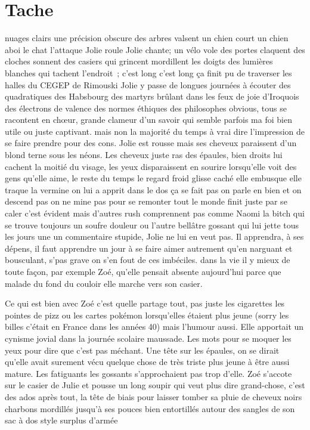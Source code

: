  \section*{Tache}
 nuages clairs une précision obscure des arbres valsent un chien court un
 chien aboi le chat l’attaque Jolie roule Jolie chante; un vélo vole des portes
 claquent des cloches sonnent des casiers qui grincent mordillent les doigts
 des lumières blanches qui tachent l’endroit ; c’est long c’est long ça finit
 pu de traverser les halles du  CEGEP de Rimouski Jolie y passe de
 longues journées à écouter des quadratiques des Habsbourg des martyrs brûlant
 dans les feux de joie d’Iroquois des électrons de valence des normes éthiques
 des philosophes obvious, tous se racontent en chœur, grande clameur d’un
 savoir qui semble parfois ma foi bien utile ou juste captivant. mais non la
 majorité du temps à vrai dire l’impression de se faire prendre pour des cons.
 Jolie est rousse mais ses cheveux paraissent d’un blond terne sous les néons.
 Les cheveux juste ras des épaules, bien droits lui cachent la moitié du
 visage, les yeux disparaissent en sourire lorsqu’elle voit des gens qu’elle
 aime, le reste du temps le regard froid glisse caché elle embusque elle traque
 la vermine on lui a apprit dans le dos ça se fait pas on parle en bien et on
 descend pas on ne mine pas pour se remonter tout le monde finit juste par se
 caler c’est évident mais d’autres rush comprennent pas comme Naomi la bitch
 qui se trouve toujours un soufre douleur ou l’autre bellâtre gossant qui lui
 jette tous les jours une un commentaire stupide, Jolie ne lui en veut pas. Il
 apprendra, à ses dépens, il faut apprendre un jour à se faire aimer autrement
 qu’en narguant et bousculant, s’pas grave on s’en fout de ces imbéciles. dans
 la vie il y mieux de toute façon, par exemple Zoé, qu’elle pensait absente
 aujourd’hui parce que malade du fond du couloir elle marche vers son casier.

Ce qui est bien avec Zoé c’est quelle partage tout, pas juste les cigarettes
les pointes de pizz ou les cartes pokémon lorsqu’elles étaient plus jeune
(sorry les billes c’était en France dans les années 40) mais l’humour aussi.
Elle apportait un cynisme jovial dans la journée scolaire maussade. Les mots
pour se moquer les yeux pour dire que c’est pas méchant.  Une tête sur les
épaules, on se dirait qu’elle avait surement vécu quelque chose de très triste
plus jeune à être aussi mature. Les fatiguants les gossants s’approchaient pas
trop d’elle. Zoé s’accote sur le casier de Julie et pousse un long soupir qui
veut plus dire grand-chose, c’est des ados après tout, la tête de biais pour
laisser tomber sa pluie de cheveux noirs charbons mordillés jusqu'à ses pouces
bien entortillés autour des sangles de son sac à dos style surplus d'armée


